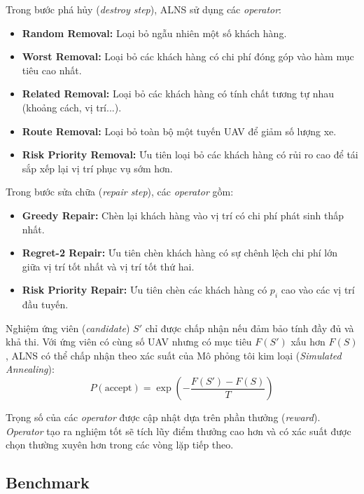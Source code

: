 \documentclass{article}
\begin{document}
Trong bước phá hủy (\textit{destroy step}), ALNS sử dụng các \textit{operator}:
\begin{itemize}
    \item \textbf{Random Removal:} Loại bỏ ngẫu nhiên một số khách hàng.
    \item \textbf{Worst Removal:} Loại bỏ các khách hàng có chi phí đóng góp vào hàm mục tiêu cao nhất.
    \item \textbf{Related Removal:} Loại bỏ các khách hàng có tính chất tương tự nhau (khoảng cách, vị trí...).
    \item \textbf{Route Removal:} Loại bỏ toàn bộ một tuyến UAV để giảm số lượng xe.
    \item \textbf{Risk Priority Removal:} Ưu tiên loại bỏ các khách hàng có rủi ro cao để tái sắp xếp lại vị trí phục vụ sớm hơn.
\end{itemize}

Trong bước sửa chữa (\textit{repair step}), các \textit{operator} gồm:
\begin{itemize}
    \item \textbf{Greedy Repair:} Chèn lại khách hàng vào vị trí có chi phí phát sinh thấp nhất.
    \item \textbf{Regret-2 Repair:} Ưu tiên chèn khách hàng có sự chênh lệch chi phí lớn giữa vị trí tốt nhất và vị trí tốt thứ hai.
    \item \textbf{Risk Priority Repair:} Ưu tiên chèn các khách hàng có $p_i$ cao vào các vị trí đầu tuyến.
\end{itemize}

Nghiệm ứng viên (\textit{candidate}) $S'$ chỉ được chấp nhận nếu đảm bảo tính đầy đủ và khả thi. Với ứng viên có cùng số UAV nhưng có mục tiêu $F(S')$ xấu hơn $F(S)$, ALNS có thể chấp nhận theo xác suất của Mô phỏng tôi kim loại (\textit{Simulated Annealing}):
\begin{equation}
    P(\text{accept}) = \exp\left( -\frac{F(S') - F(S)}{T} \right)
\end{equation}

Trọng số của các \textit{operator} được cập nhật dựa trên phần thưởng (\textit{reward}). \textit{Operator} tạo ra nghiệm tốt sẽ tích lũy điểm thưởng cao hơn và có xác suất được chọn thường xuyên hơn trong các vòng lặp tiếp theo.

\subsection{Benchmark}
\end{document}
